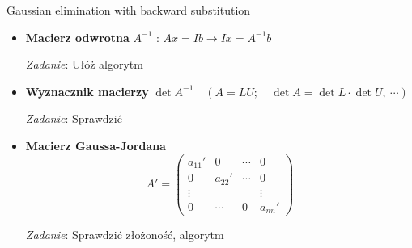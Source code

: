 \begin{frame}{Gaussian elimination with backward substitution}
\begin{itemize}
\item \textbf{Macierz odwrotna} \newline
$A^{-1}$ : $Ax=Ib\rightarrow Ix=A^{-1}b$
\begin{flushright}
{\it Zadanie}: Ułóż algorytm
\end{flushright}
\item \textbf{Wyznacznik macierzy}
$\det A^{-1}\quad(A=LU;\quad \det A=\det L\cdot\det U,\ \cdots)$
\begin{flushright}
{\it Zadanie}: Sprawdzić
\end{flushright}
\item \textbf{Macierz Gaussa-Jordana}
$$
A'=\left(\begin{array}{llll}
a_{11}' & 0 & \cdots & 0\\
0 & a_{22}' & \cdots & 0\\
\vdots &  &  & \vdots\\
 0 & \cdots & 0 & a_{nn}'
\end{array}\right)
$$
\begin{flushright}
{\it Zadanie}: Sprawdzić złożoność, algorytm
\end{flushright}
\end{itemize}
\end{frame}
